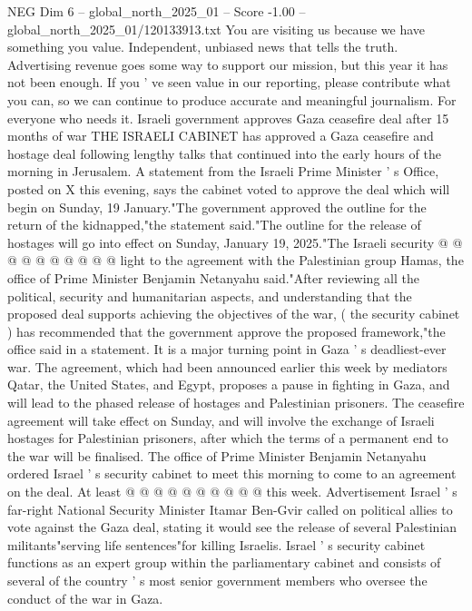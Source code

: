 \begin{textsample}{NEG Dim 6 – global\_north\_2025\_01 – Score -1.00 – global\_north\_2025\_01/120133913.txt}  \label{ex:f6_neg_184}
You are visiting us because we have something you value.
Independent, unbiased news that tells the truth.
Advertising revenue goes some way to support our mission, but this year it has not been enough.
If you ' ve seen value in our reporting, please contribute what you can, so we can continue to produce accurate and meaningful journalism.
For everyone who needs it.
Israeli government approves Gaza ceasefire deal after 15 months of war THE ISRAELI CABINET has approved a Gaza ceasefire and hostage deal following lengthy talks that continued into the early hours of the morning in Jerusalem.
A statement from the Israeli Prime Minister ' s Office, posted on X this evening, says the cabinet voted to approve the deal which will begin on Sunday, 19 January."The government approved the outline for the return of the kidnapped,"the statement said."The outline for the release of hostages will go into effect on Sunday, January 19, 2025."The Israeli security @ @ @ @ @ @ @ @ @ @ light to the agreement with the Palestinian group Hamas, the office of Prime Minister Benjamin Netanyahu said."After reviewing all the political, security and humanitarian aspects, and understanding that the proposed deal supports achieving the objectives of the war, ( the security cabinet ) has recommended that the government approve the proposed framework,"the office said in a statement.
It is a major turning point in Gaza ' s deadliest-ever war.
The agreement, which had been announced earlier this week by mediators Qatar, the United States, and Egypt, proposes a pause in fighting in Gaza, and will lead to the phased release of hostages and Palestinian prisoners.
The ceasefire agreement will take effect on Sunday, and will involve the exchange of Israeli hostages for Palestinian prisoners, after which the terms of a permanent end to the war will be finalised.
The office of Prime Minister Benjamin Netanyahu ordered Israel ' s security cabinet to meet this morning to come to an agreement on the deal.
At least @ @ @ @ @ @ @ @ @ @ this week.
Advertisement Israel ' s far-right National Security Minister Itamar Ben-Gvir called on political allies to vote against the Gaza deal, stating it would see the release of several Palestinian militants"serving life sentences"for killing Israelis.
Israel ' s security cabinet functions as an expert group within the parliamentary cabinet and consists of several of the country ' s most senior government members who oversee the conduct of the war in Gaza.

\end{textsample}
